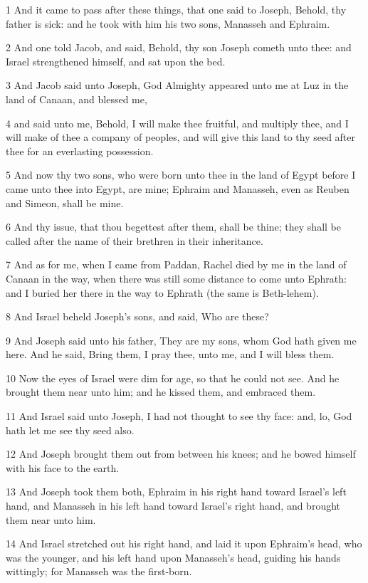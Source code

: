 \par 1 And it came to pass after these things, that one said to Joseph, Behold, thy father is sick: and he took with him his two sons, Manasseh and Ephraim.
\par 2 And one told Jacob, and said, Behold, thy son Joseph cometh unto thee: and Israel strengthened himself, and sat upon the bed.
\par 3 And Jacob said unto Joseph, God Almighty appeared unto me at Luz in the land of Canaan, and blessed me,
\par 4 and said unto me, Behold, I will make thee fruitful, and multiply thee, and I will make of thee a company of peoples, and will give this land to thy seed after thee for an everlasting possession.
\par 5 And now thy two sons, who were born unto thee in the land of Egypt before I came unto thee into Egypt, are mine; Ephraim and Manasseh, even as Reuben and Simeon, shall be mine.
\par 6 And thy issue, that thou begettest after them, shall be thine; they shall be called after the name of their brethren in their inheritance.
\par 7 And as for me, when I came from Paddan, Rachel died by me in the land of Canaan in the way, when there was still some distance to come unto Ephrath: and I buried her there in the way to Ephrath (the same is Beth-lehem).
\par 8 And Israel beheld Joseph's sons, and said, Who are these?
\par 9 And Joseph said unto his father, They are my sons, whom God hath given me here. And he said, Bring them, I pray thee, unto me, and I will bless them.
\par 10 Now the eyes of Israel were dim for age, so that he could not see. And he brought them near unto him; and he kissed them, and embraced them.
\par 11 And Israel said unto Joseph, I had not thought to see thy face: and, lo, God hath let me see thy seed also.
\par 12 And Joseph brought them out from between his knees; and he bowed himself with his face to the earth.
\par 13 And Joseph took them both, Ephraim in his right hand toward Israel's left hand, and Manasseh in his left hand toward Israel's right hand, and brought them near unto him.
\par 14 And Israel stretched out his right hand, and laid it upon Ephraim's head, who was the younger, and his left hand upon Manasseh's head, guiding his hands wittingly; for Manasseh was the first-born.
